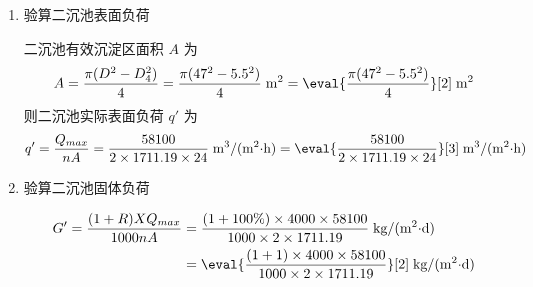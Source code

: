 \begin{enumerate}
	\item 验算二沉池表面负荷
	
	二沉池有效沉淀区面积 $A$ 为
	\begin{align}
		A = \dfrac{\pi (D^2-D_4^2)}{4} = \dfrac{\pi (47^2-5.5^2)}{4} \;\text{m$^2$} = \eval{\dfrac{\pi (47^2-5.5^2)}{4}}[2] \;\text{m$^2$}
	\end{align}
	则二沉池实际表面负荷 $q'$ 为
	\begin{align}
		q' = \dfrac{Q_{max}}{nA} = \dfrac{58100}{2 \times 1711.19\times 24} \;\text{m$^3$/(m$^2\cdot$h)} = \eval{\dfrac{58100}{2 \times 1711.19\times 24}}[3]  \;\text{m$^3$/(m$^2\cdot$h)}
	\end{align}

	\item 验算二沉池固体负荷
	
	\begin{align}
		G' = \dfrac{(1+R)XQ_{max}}{1000nA} &= \dfrac{(1+100\%)\times 4000 \times 58100}{1000\times 2 \times 1711.19} \;\text{kg/(m$^2\cdot$d)} \\
		&= \eval{\dfrac{(1+1)\times 4000 \times 58100}{1000\times 2 \times 1711.19}}[2] \;\text{kg/(m$^2\cdot$d)} \notag
	\end{align}
\end{enumerate}



